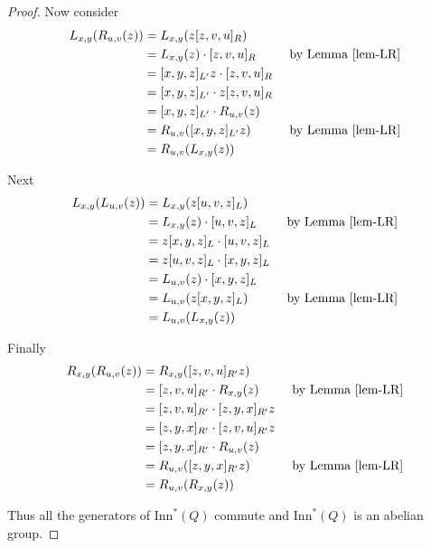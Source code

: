\documentclass[12pt, twoside, openright]{report}
\theoremstyle{definition}
\newcommand{\inn}{\text{Inn}}       %
\begin{document}
\begin{proof}
  Now consider
  \begin{alignat*}{2}
    L_{x, y}(R_{u, v}(z)) &= L_{x, y}(z[z, v, u]_R) &&\\
    &= L_{x, y}(z)\cdot [z, v, u]_R &&\text{ by Lemma \ref{lem-LR}}\\
    &= [x, y, z]_{L'}z\cdot [z, v, u]_R &&\\
    &= [x, y, z]_{L'} \cdot z[z, v, u]_R &&\\
    &= [x, y, z]_{L'}\cdot R_{u, v}(z) &&\\
    &= R_{u, v}([x, y, z]_{L'}z) &&\text{ by Lemma \ref{lem-LR}}\\
    &= R_{u, v}(L_{x, y}(z)) &&
  \end{alignat*}

  Next
  \begin{alignat*}{2}
    L_{x, y}(L_{u, v}(z)) &= L_{x, y}(z[u, v, z]_L) &&\\
    &= L_{x, y}(z)\cdot [u, v, z]_L &&\text{ by Lemma \ref{lem-LR}}\\
    &= z[x, y, z]_L\cdot [u, v, z]_L &&\\
    &= z[u, v, z]_L\cdot [x, y, z]_L &&\\
    &= L_{u, v}(z)\cdot [x, y, z]_L &&\\
    &= L_{u, v}(z[x, y, z]_L) &&\text{ by Lemma \ref{lem-LR}}\\
    &= L_{u, v}(L_{x, y}(z)) &&
  \end{alignat*}

  Finally
  \begin{alignat*}{2}
    R_{x, y}(R_{u, v}(z)) &= R_{x, y}([z, v, u]_{R'}z) &&\\
    &= [z, v, u]_{R'}\cdot R_{x, y}(z) &&\text{ by Lemma \ref{lem-LR}}\\
    &= [z, v, u]_{R'}\cdot [z, y, x]_{R'}z &&\\
    &= [z, y, x]_{R'}\cdot [z, v, u]_{R'}z &&\\
    &= [z, y, x]_{R'}\cdot R_{u, v}(z) &&\\
    &= R_{u, v}([z, y, x]_{R'}z) &&\text{ by Lemma \ref{lem-LR}}\\
    &= R_{u, v}(R_{x, y}(z)) &&
  \end{alignat*}

  Thus all the generators of $\inn^*(Q)$ commute and $\inn^*(Q)$ is an abelian group.
\end{proof}

\end{document}
